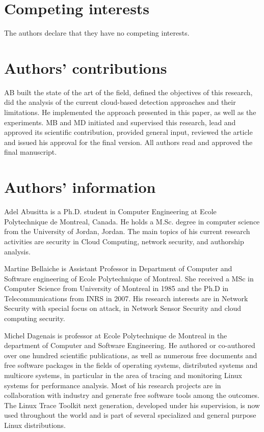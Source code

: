 \documentclass[twocolumn]{bmcart}%
\begin{document}
\begin{backmatter}

\section*{Competing interests}
  The authors declare that they have no competing interests.

\section*{Authors' contributions}
 AB built the state of the art of the field, defined the objectives of this research,
did the analysis of the current cloud-based detection approaches and their
limitations. He implemented the approach presented in this paper, as well
as the experiments. MB and MD initiated and supervised this research, lead and
approved its scientific contribution, provided general input, reviewed the
article and issued his approval for the final version. All authors read and
approved the final manuscript.

\section*{Authors’ information}

Adel Abusitta is a Ph.D. student in Computer Engineering at Ecole Polytechnique de Montreal, Canada. He holds a M.Sc. degree in computer science from the University of Jordan, Jordan. The main topics of his current research activities are security in Cloud Computing, network security, and authorship analysis.

Martine Bellaiche is Assistant Professor in Department of Computer and Software engineering of Ecole Polytechnique of Montreal.
She received a MSc in Computer Science from University of Montreal in 1985 and the Ph.D in Telecommunications from INRS in 2007. His research
interests are in Network Security with special focus on attack, in Network Sensor Security and cloud computing security.

Michel Dagenais is professor at Ecole Polytechnique de Montreal in the department of Computer and Software Engineering. He authored or co-authored over one hundred scientific publications, as well as numerous free documents and free software packages in the fields of operating systems, distributed systems and multicore systems, in particular in the area of tracing and monitoring Linux systems for performance analysis. Most of his research projects are in collaboration with industry and generate free software tools among the outcomes. The Linux Trace Toolkit next generation, developed under his supervision, is now used throughout the world and is part of several specialized and general purpose Linux distributions.


\end{backmatter}
\end{document}
